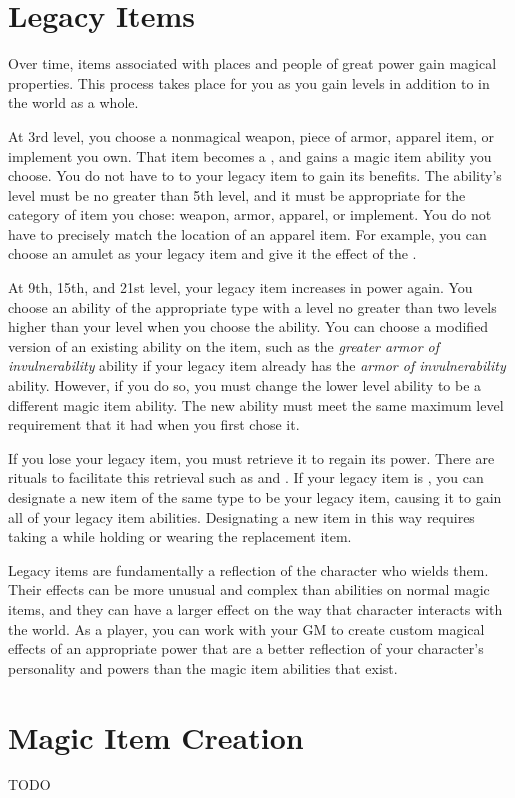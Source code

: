     

\section{Legacy Items}\label{Legacy Items}

    Over time, items associated with places and people of great power gain magical properties.
    This process takes place for you as you gain levels in addition to in the world as a whole.

    At 3rd level, you choose a nonmagical weapon, piece of armor, apparel item, or implement you own.
    That item becomes a , and gains a magic item ability you choose.
    You do not have to  to your legacy item to gain its benefits.
    The ability's level must be no greater than 5th level, and it must be appropriate for the category of item you chose: weapon, armor, apparel, or implement.
    You do not have to precisely match the location of an apparel item.
    For example, you can choose an amulet as your legacy item and give it the effect of the .

    At 9th, 15th, and 21st level, your legacy item increases in power again.
    You choose an ability of the appropriate type with a level no greater than two levels higher than your level when you choose the ability.
    You can choose a modified version of an existing ability on the item, such as the \textit{greater armor of invulnerability} ability if your legacy item already has the \textit{armor of invulnerability} ability.
    However, if you do so, you must change the lower level ability to be a different magic item ability.
    The new ability must meet the same maximum level requirement that it had when you first chose it.

    If you lose your legacy item, you must retrieve it to regain its power.
    There are rituals to facilitate this retrieval such as  and .
    If your legacy item is , you can designate a new item of the same type to be your legacy item, causing it to gain all of your legacy item abilities.
    Designating a new item in this way requires taking a  while holding or wearing the replacement item.

        Legacy items are fundamentally a reflection of the character who wields them.
        Their effects can be more unusual and complex than abilities on normal magic items, and they can have a larger effect on the way that character interacts with the world.
        As a player, you can work with your GM to create custom magical effects of an appropriate power that are a better reflection of your character's personality and powers than the magic item abilities that exist.

\section{Magic Item Creation}\label{Magic Item Creation}

    TODO

